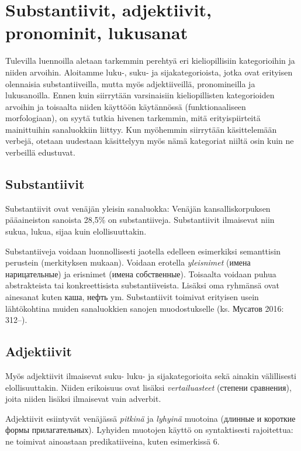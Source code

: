 \documentclass[]{scrreprt}
\begin{document}
\section{Substantiivit, adjektiivit, pronominit,
lukusanat}\label{substantiivit-adjektiivit-pronominit-lukusanat}

Tulevilla luennoilla aletaan tarkemmin perehtyä eri kieliopillisiin
kategorioihin ja niiden arvoihin. Aloitamme luku-, suku- ja
sijakategorioista, jotka ovat erityisen olennaisia substantiiveilla,
mutta myös adjektiiveillä, pronomineilla ja lukusanoilla. Ennen kuin
siirrytään varsinaisiin kieliopillisten kategorioiden arvoihin ja
toisaalta niiden käyttöön käytännössä (funktionaaliseen morfologiaan),
on syytä tutkia hivenen tarkemmin, mitä erityispiirteitä mainittuihin
sanaluokkiin liittyy. Kun myöhemmin siirrytään käsittelemään verbejä,
otetaan uudestaan käsittelyyn myös nämä kategoriat niiltä osin kuin ne
verbeillä edustuvat.

\subsection{Substantiivit}\label{substantiivit}

Substantiivit ovat venäjän yleisin sanaluokka: Venäjän
kansalliskorpuksen pääaineiston sanoista 28,5\% on substantiiveja.
Substantiivit ilmaisevat niin sukua, lukua, sijaa kuin elollisuuttakin.

Substantiiveja voidaan luonnollisesti jaotella edelleen esimerkiksi
semanttisin perustein (merkityksen mukaan). Voidaan erotella
\emph{yleisnimet} (имена нарицательные) ja erisnimet (имена
собственные). Toisaalta voidaan puhua abstrakteista tai konkreettisista
substantiiveista. Lisäksi oma ryhmänsä ovat ainesanat kuten каша, нефть
ym. Substantiivit toimivat erityisen usein lähtökohtina muiden
sanaluokkien sanojen muodostukselle (ks. Мусатов 2016: 312--).

\subsection{Adjektiivit}\label{adjektiivit}

Myös adjektiivit ilmaisevat suku- luku- ja sijakategorioita sekä ainakin
välillisesti elollisuuttakin. Niiden erikoisuus ovat lisäksi
\emph{vertailuasteet} (степени сравнения), joita niiden lisäksi
ilmaisevat vain adverbit.

Adjektiivit esiintyvät venäjässä \emph{pitkinä} ja \emph{lyhyinä}
muotoina (длинные и короткие формы прилагательных). Lyhyiden muotojen
käyttö on syntaktisesti rajoitettua: ne toimivat ainoastaan
predikatiiveina, kuten esimerkissä 6.
\end{document}
